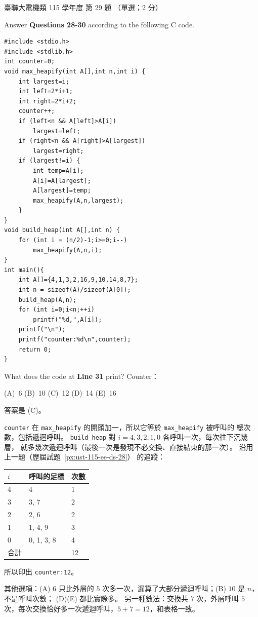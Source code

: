 \begin{pastexam}[label={px:ust-115-ee-ds-29}]{臺聯大電機類 115 學年度 第 29 題}
（單選；2 分）

Answer \textbf{Questions 28-30} according to the following C code.
\begin{verbatim}
#include <stdio.h>
#include <stdlib.h>
int counter=0;
void max_heapify(int A[],int n,int i) {
    int largest=i;
    int left=2*i+1;
    int right=2*i+2;
    counter++;
    if (left<n && A[left]>A[i])
        largest=left;
    if (right<n && A[right]>A[largest])
        largest=right;
    if (largest!=i) {
        int temp=A[i];
        A[i]=A[largest];
        A[largest]=temp;
        max_heapify(A,n,largest);
    }
}
void build_heap(int A[],int n) {
    for (int i = (n/2)-1;i>=0;i--)
        max_heapify(A,n,i);
}
int main(){
    int A[]={4,1,3,2,16,9,10,14,8,7};
    int n = sizeof(A)/sizeof(A[0]);
    build_heap(A,n);
    for (int i=0;i<n;++i)
        printf("%d,",A[i]);
    printf("\n");
    printf("counter:%d\n",counter);
    return 0;
}
\end{verbatim}

What does the code at \textbf{Line 31} print? Counter：\underline{\hspace{2em}}

(A)~6 \qquad (B)~10 \qquad (C)~12 \qquad (D)~14 \qquad (E)~16
\end{pastexam}

\begin{pastsoln}
答案是 (C)。

\texttt{counter} 在 \texttt{max\_heapify} 的開頭加一，所以它等於 \texttt{max\_heapify} 被呼叫的
總次數，包括遞迴呼叫。 \texttt{build\_heap} 對 $i = 4, 3, 2, 1, 0$ 各呼叫一次，每次往下沉幾層，
就多幾次遞迴呼叫（最後一次是發現不必交換、直接結束的那一次）。 沿用上一題（歷屆試題~\ref{px:ust-115-ee-ds-28}）
的追蹤：
\begin{center}
\begin{tabular}{lll}
\toprule
$i$ & 呼叫的足標 & 次數 \\
\midrule
4 & 4 & 1 \\
3 & 3, 7 & 2 \\
2 & 2, 6 & 2 \\
1 & 1, 4, 9 & 3 \\
0 & 0, 1, 3, 8 & 4 \\
\midrule
合計 & & 12 \\
\bottomrule
\end{tabular}
\end{center}
所以印出 \texttt{counter:12}。

其他選項：(A) $6$ 只比外層的 $5$ 次多一次，漏算了大部分遞迴呼叫；(B) $10$ 是 $n$，不是呼叫次數；
(D)(E) 都比實際多。 另一種數法：交換共 $7$ 次，外層呼叫 $5$ 次，每次交換恰好多一次遞迴呼叫，$5 + 7 = 12$，和表格一致。
\end{pastsoln}
